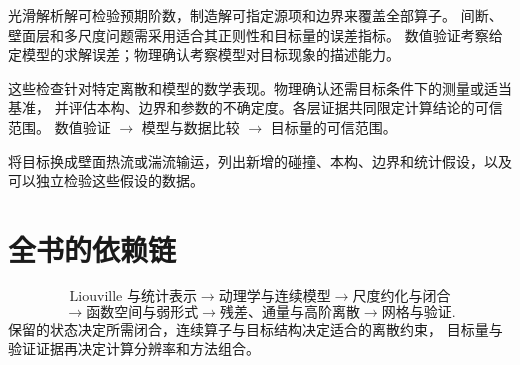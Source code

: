 光滑解析解可检验预期阶数，制造解可指定源项和边界来覆盖全部算子。
间断、壁面层和多尺度问题需采用适合其正则性和目标量的误差指标。
数值验证考察给定模型的求解误差；物理确认考察模型对目标现象的描述能力。

{这些检查针对特定离散和模型的数学表现。物理确认还需目标条件下的测量或适当基准，
并评估本构、边界和参数的不确定度。各层证据共同限定计算结论的可信范围。}
{数值验证 $\longrightarrow$ 模型与数据比较 $\longrightarrow$ 目标量的可信范围。}

{将目标换成壁面热流或湍流输运，列出新增的碰撞、本构、边界和统计假设，以及可以独立检验这些假设的数据。}

\section{全书的依赖链}
\[
\text{Liouville 与统计表示}
\longrightarrow\text{动理学与连续模型}
\longrightarrow\text{尺度约化与闭合}
\]
\[
\longrightarrow\text{函数空间与弱形式}
\longrightarrow\text{残差、通量与高阶离散}
\longrightarrow\text{网格与验证}.
\]
保留的状态决定所需闭合，连续算子与目标结构决定适合的离散约束，
目标量与验证证据再决定计算分辨率和方法组合。

